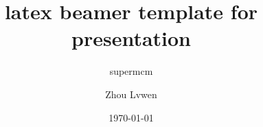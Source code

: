 \documentclass[red]{beamer}
\begin{document}
\title{latex beamer template for presentation}
\subtitle{supermcm}
\author{Zhou Lvwen}
\date{\today}
\frame[plain]{\titlepage}
\frame{\tableofcontents}






\end{document}
